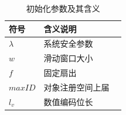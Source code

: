 \begin{table}[htbp]
	\centering
	\caption{初始化参数及其含义}
	\label{tab:system_init_config}
	\begin{tabular}{@{} l l l @{}}
		\toprule
		符号 & 含义说明 \\
		\midrule
		$\lambda$ & 系统安全参数 \\
		$w$ & 滑动窗口大小 \\
		$f$ & 固定扇出 \\
		$maxID$ & 对象注册空间上届 \\
		$l_v$ & 数值编码位长 \\
		\bottomrule
	\end{tabular}
\end{table}